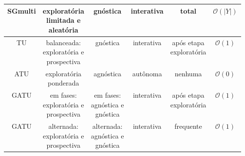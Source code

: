 \begin{table}
{\begin{tabular}{c|c|c|c|c|c}
SGmulti&\makecell{exploratória\\limitada e\\aleatória}&gnóstica&interativa&total&$\mathcal{O}(|Y|)$\\ \hline
TU&\makecell{balanceada:\\exploratória e\\prospectiva}&gnóstica&interativa&\makecell{após etapa\\exploratória}&$\mathcal{O}(1)$\\ \hline
ATU&\makecell{exploratória\\ponderada}&agnóstica&autônoma&nenhuma&$\mathcal{O}(0)$\\ \hline
GATU&\makecell{em fases:\\exploratória e\\prospectiva}&\makecell{em fases:\\agnóstica e\\gnóstica}&interativa&\makecell{após etapa\\exploratória}&$\mathcal{O}(1)$\\ \hline
GATU&\makecell{alternada:\\exploratória e\\prospectiva}&\makecell{alternada:\\agnóstica e\\gnóstica}&interativa&frequente&$\mathcal{O}(1)$\\ \hline
\end{tabular}
}
\label{stratscompleta}
\end{table}

